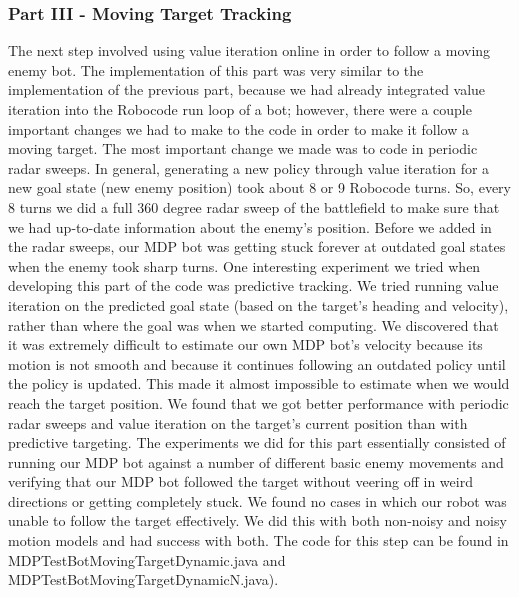 \documentclass{aiaa-tc}%
\begin{document}
\subsubsection{Part III - Moving Target Tracking}
The next step involved using value iteration online in order to follow a moving enemy bot. The implementation of this part was very similar to the implementation of the previous part, because we had already integrated value iteration into the Robocode run loop of a bot; however, there were a couple important changes we had to make to the code in order to make it follow a moving target. The most important change we made was to code in periodic radar sweeps. In general, generating a new policy through value iteration for a new goal state (new enemy position) took about 8 or 9 Robocode turns. So, every 8 turns we did a full 360 degree radar sweep of the battlefield to make sure that we had up-to-date information about the enemy's position. Before we added in the radar sweeps, our MDP bot was getting stuck forever at outdated goal states when the enemy took sharp turns. 
One interesting experiment we tried when developing this part of the code was predictive tracking. We tried running value iteration on the predicted goal state (based on the target's heading and velocity), rather than where the goal was when we started computing. We discovered that it was extremely difficult to estimate our own MDP bot's velocity because its motion is not smooth and because it continues following an outdated policy until the policy is updated. This made it almost impossible to estimate when we would reach the target position. We found that we got better performance with periodic radar sweeps and value iteration on the target's current position than with predictive targeting. The experiments we did for this part essentially consisted of running our MDP bot against a number of different basic enemy movements and verifying that our MDP bot followed the target without veering off in weird directions or getting completely stuck. We found no cases in which our robot was unable to follow the target effectively. We did this with both non-noisy and noisy motion models and had success with both. The code for this step can be found in MDPTestBotMovingTargetDynamic.java and MDPTestBotMovingTargetDynamicN.java).
\end{document}

